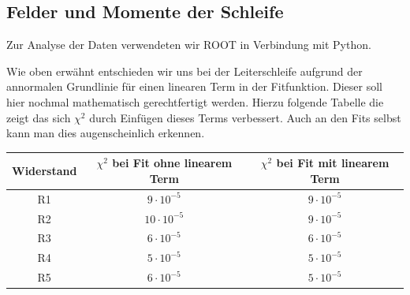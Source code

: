 \documentclass[12pt]{article}
\begin{document}
\subsection{Felder und Momente der Schleife}
Zur Analyse der Daten verwendeten wir ROOT in Verbindung mit Python.

Wie oben erwähnt entschieden wir uns bei der Leiterschleife aufgrund der annormalen Grundlinie für einen linearen Term in der Fitfunktion. Dieser soll hier nochmal mathematisch gerechtfertigt werden. Hierzu folgende Tabelle die zeigt das sich $\chi^2$ durch Einfügen dieses Terms verbessert. Auch an den Fits selbst kann man dies augenscheinlich erkennen.

\begin{center}
\begin{tabular}{|c|cc|}
\hline
Widerstand & $\chi^2$ bei Fit ohne linearem Term & $\chi^2$ bei Fit mit linearem Term \\ 
\hline
R1 & $9 \cdot 10^{-5}$ & $9 \cdot 10^{-5}$ \\ 
R2 & $10 \cdot 10^{-5}$ & $9 \cdot 10^{-5}$ \\ 
R3 & $6 \cdot 10^{-5}$ & $6 \cdot 10^{-5}$ \\ 
R4 & $5 \cdot 10^{-5}$ & $5 \cdot 10^{-5}$ \\ 
R5 & $6 \cdot 10^{-5}$ & $5 \cdot 10^{-5}$ \\
\hline
\end{tabular}
\end{center}
\end{document}
